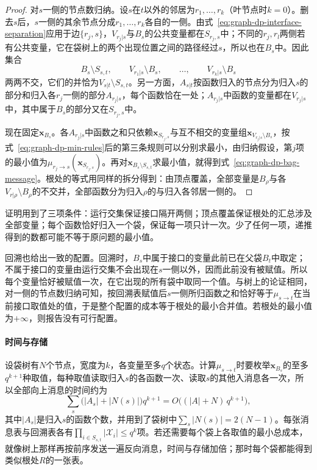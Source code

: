 \begin{proof}
对$s$一侧的节点数归纳。设$s$在$t$以外的邻居为$r_1,\ldots,r_k$（叶节点时$k=0$）。删去$s$后，$s$一侧的其余节点分成$r_1,\ldots,r_k$各自的一侧。由式~\eqref{eq:graph-dp-interface-separation}应用于边$\{r_j,s\}$，$V_{r_j|s}$与$B_s$的公共变量都在$S_{r_j,s}$中；不同的$r_j,r_l$两侧若有公共变量，它在袋树上的两个出现位置之间的路径经过$s$，所以也在$B_s$中。因此集合
\[
B_s\setminus S_{s,t},\qquad V_{r_1|s}\setminus B_s,\qquad\ldots,\qquad V_{r_k|s}\setminus B_s
\]
两两不交，它们的并恰为$V_{s|t}\setminus S_{s,t}$。另一方面，$A_{s|t}$按函数归入的节点分为归入$s$的部分和归入各$r_j$一侧的部分$A_{r_j|s}$，每个函数恰在一处；$A_{r_j|s}$中函数的变量都在$V_{r_j|s}$中，其中属于$B_s$的部分又在$S_{r_j,s}$中。

现在固定$\bm x_{B_s}$。各$A_{r_j|s}$中函数之和只依赖$\bm x_{S_{r_j,s}}$与互不相交的变量组$\bm x_{V_{r_j|s}\setminus B_s}$，按式~\eqref{eq:graph-dp-min-rules}后的第三条规则可以分别求最小，由归纳假设，第$j$项的最小值为$\mu_{r_j\to s}(\bm x_{S_{r_j,s}})$。再对$\bm x_{B_s\setminus S_{s,t}}$求最小值，就得到式~\eqref{eq:graph-dp-bag-message}。根处的等式用同样的拆分得到：由顶点覆盖，全部变量是$B_\rho$与各$V_{r|\rho}\setminus B_\rho$的不交并，全部函数分为归入$\rho$的与归入各邻居一侧的。
\end{proof}

证明用到了三项条件：运行交集保证接口隔开两侧；顶点覆盖保证根处的汇总涉及全部变量；每个函数恰好归入一个袋，保证每一项只计一次。少了任何一项，递推得到的数都可能不等于原问题的最小值。

回溯也给出一致的配置。回溯时，$B_s$中属于接口的变量此前已在父袋$B_t$中取定；不属于接口的变量由运行交集不会出现在$s$一侧以外，因而此前没有被赋值。所以每个变量恰好被赋值一次，在它出现的所有袋中取同一个值。与树上的论证相同，对一侧的节点数归纳可知，按回溯表赋值后$s$一侧所归函数之和恰好等于$\mu_{s\to t}$在当前接口取值处的值，于是整个配置的成本等于根处的最小合并值。若根处的最小值为$+\infty$，则报告没有可行配置。

\paragraph{时间与存储}
设袋树有$N$个节点，宽度为$k$，各变量至多$q$个状态。计算$\mu_{s\to t}$时要枚举$\bm x_{B_s}$的至多$q^{k+1}$种取值，每种取值读取归入$s$的各函数一次、读取$s$的其他入消息各一次，所以全部向上消息的时间约为
\[
\sum_{s}\bigl(|A_s|+|N(s)|\bigr)q^{k+1}=O\bigl((|A|+N)\,q^{k+1}\bigr),
\]
其中$|A_s|$是归入$s$的函数个数，并用到了袋树中$\sum_s|N(s)|=2(N-1)$。每张消息表与回溯表各有$\prod_{i\in S_{s,t}}|\mathcal X_i|\leq q^{k}$项。若还需要每个袋上各取值的最小总成本，就像树上那样再按前序发送一遍反向消息，时间与存储加倍；那时每个袋都能得到类似根处$R$的一张表。

